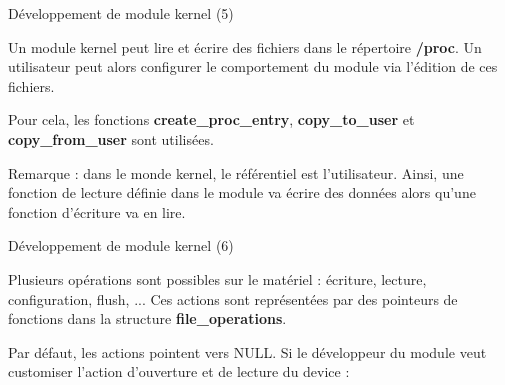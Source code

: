 \documentclass[12pt, t]{beamer}
\begin{document}
\begin{frame}{Développement de module kernel (5)}

    \vspace{20pt}
    Un module kernel peut lire et écrire des fichiers dans le répertoire
    {\textbf{/proc}}. Un utilisateur peut alors configurer le comportement
    du module via l'édition de ces fichiers.

    \vspace{20pt}
    Pour cela, les fonctions {\textbf{create\_proc\_entry}}, {\textbf{copy\_to\_user}}
    et {\textbf{copy\_from\_user}} sont utilisées.

    {
        \vspace{20pt}
        Remarque : dans le monde kernel, le référentiel est l'utilisateur. Ainsi,
        une fonction de lecture définie dans le module va écrire des données alors
        qu'une fonction d'écriture va en lire.
    }

\end{frame}


\begin{frame}{Développement de module kernel (6)}

    \vspace{15pt}
    Plusieurs opérations sont possibles sur le matériel : écriture, lecture,
    configuration, flush, ... Ces actions sont représentées par des pointeurs
    de fonctions dans la structure {\textbf{file\_operations}}.

    {
        \vspace{15pt}
        Par défaut, les actions pointent vers NULL. Si le développeur du module
        veut customiser l'action d'ouverture et de lecture du device :
        \vspace{8pt}
        \lstfops
    }

\end{frame}
\end{document}
